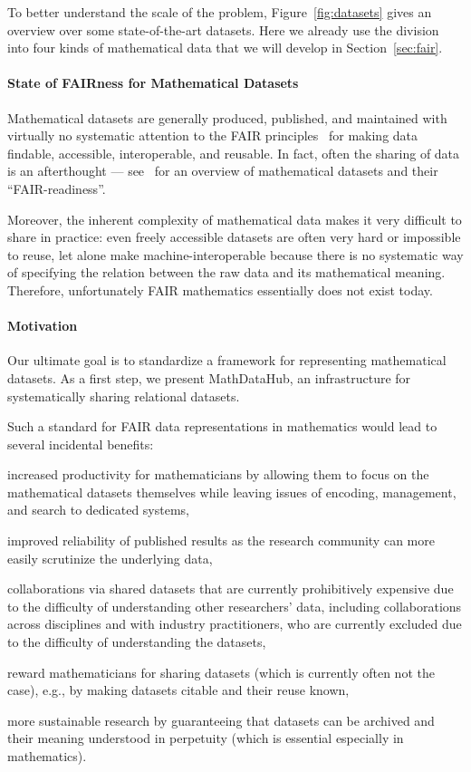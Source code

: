 To better understand the scale of the problem, Figure~\ref{fig:datasets} gives an overview over some state-of-the-art datasets.
Here we already use the division into four kinds of mathematical data that we will develop in Section~\ref{sec:fair}.

\paragraph{State of FAIRness for Mathematical Datasets}
Mathematical datasets are generally produced, published, and maintained with virtually no systematic attention to the FAIR principles~\cite{FAIR,WilDumAal:FAIR16} for making data findable, accessible, interoperable, and reusable.
In fact, often the sharing of data is an afterthought --- see~\cite{Bercic:cmo:wiki} for an overview of mathematical datasets and their ``FAIR-readiness''.

Moreover, the inherent complexity of mathematical data makes it very difficult to share in practice: even freely accessible datasets are often very hard or impossible to reuse, let alone make machine-interoperable because there is no systematic way of specifying the relation between the raw data and its mathematical meaning.  Therefore, unfortunately FAIR mathematics essentially does not exist today.

\paragraph{Motivation}
Our ultimate goal is to standardize a framework for representing mathematical datasets.
As a first step, we present MathDataHub, an infrastructure for systematically sharing relational datasets.

Such a standard for FAIR data representations in mathematics would lead to several incidental benefits:
\begin{compactitem}
\item increased productivity for mathematicians by allowing them to focus on the mathematical datasets themselves while leaving issues of encoding, management, and search to dedicated systems,
\item improved reliability of published results as the research community can more easily scrutinize the underlying data,
\item collaborations via shared datasets that are currently prohibitively expensive due to the difficulty of understanding other researchers' data, including collaborations across disciplines and with industry practitioners, who are currently excluded due to the difficulty of understanding the datasets,
\item reward mathematicians for sharing datasets (which is currently often not the case), e.g., by making datasets citable and their reuse known,
\item more sustainable research by guaranteeing that datasets can be archived and their meaning understood in perpetuity (which is essential especially in mathematics).
\end{compactitem}

